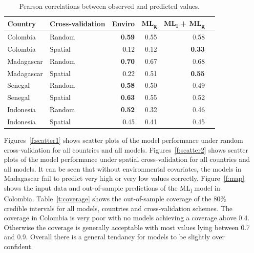 \documentclass[review]{elsarticle}
\begin{document}
\begin{table}[t!]
\caption{Pearson correlations between observed and predicted values. }
\centering
\begin{tabular}{llrrrr}
Country &  Cross-validation & Enviro &   ML\textsubscript{g} & ML\textsubscript{l} + ML\textsubscript{g} \\
\hline 
 Colombia & Random &  \textbf{0.59} &0.55 & 0.58 \\
 Colombia &  Spatial &  0.12 &  0.12 & \textbf{0.33}\\
 Madagascar &  Random &  \textbf{0.70} &  0.67 & 0.68 \\
 Madagascar &  Spatial &  0.22 &  0.51 & \textbf{0.55}\\
 Senegal &  Random &  \textbf{0.58} &  0.50 & 0.49 \\
 Senegal &  Spatial &   \textbf{0.63} & 0.55 & 0.52 \\
 Indonesia &  Random &  \textbf{0.52} & 0.32 & 0.46 \\
 Indonesia &  Spatial &  0.45 & 0.41 & 0.45 \\
\end{tabular}
\label{t:results2}
\end{table}
Figures~\ref{f:scatter1} shows scatter plots of the model performance under random cross-validation for all countries and all models.
Figures~\ref{f:scatter2} shows scatter plots of the model performance under spatial cross-validation for all countries and all models.
It can be seen that without environmental covariates, the models in Madagascar fail to predict very high or very low values correctly.
Figure~\ref{f:map} shows the input data and out-of-sample predictions of the ML\textsubscript{l} model in Colombia.
Table~\ref{t:coverage} shows the out-of-sample coverage of the 80\% credible intervals for all models, countries and cross-validation schemes.
The coverage in Colombia is very poor with no models achieving a coverage above 0.4.
Otherwise the coverage is generally acceptable with most values lying between 0.7 and 0.9.
Overall there is a general tendancy for models to be slightly over confident.
\end{document}
